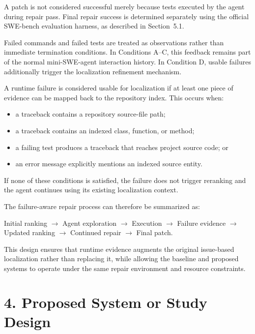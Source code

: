 \documentclass[11pt]{article}
\begin{document}
A patch is not considered successful merely because tests executed by the
agent during repair pass. Final repair success is determined separately
using the official SWE-bench evaluation harness, as described in
Section~5.1.

Failed commands and failed tests are treated as observations rather than
immediate termination conditions. In Conditions A--C, this feedback
remains part of the normal mini-SWE-agent interaction history. In
Condition D, usable failures additionally trigger the localization
refinement mechanism.

A runtime failure is considered usable for localization if at least one
piece of evidence can be mapped back to the repository index. This occurs
when:

\begin{itemize}[leftmargin=*, itemsep=0.25em]
    \item a traceback contains a repository source-file path;
    \item a traceback contains an indexed class, function, or method;
    \item a failing test produces a traceback that reaches project source
          code; or
    \item an error message explicitly mentions an indexed source entity.
\end{itemize}

If none of these conditions is satisfied, the failure does not trigger
reranking and the agent continues using its existing localization context.

The failure-aware repair process can therefore be summarized as:

\begin{center}
Initial ranking
$\rightarrow$
Agent exploration
$\rightarrow$
Execution
$\rightarrow$
Failure evidence
$\rightarrow$
Updated ranking
$\rightarrow$
Continued repair
$\rightarrow$
Final patch.
\end{center}

This design ensures that runtime evidence augments the original issue-based
localization rather than replacing it, while allowing the baseline and
proposed systems to operate under the same repair environment and resource
constraints.


\section*{4. Proposed System or Study Design}
\end{document}
